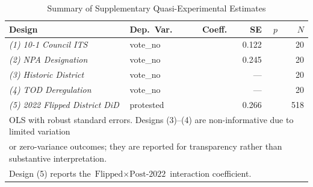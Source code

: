 \begin{table}[H]
\centering
\caption{Summary of Supplementary Quasi-Experimental Estimates}
\label{tab:geographic_causal}
\small
\begin{tabular}{@{}llrrrr@{}}
\toprule
\textbf{Design} & \textbf{Dep.\ Var.} & \textbf{Coeff.} & \textbf{SE} & \textbf{$p$} & \textbf{$N$} \\
\midrule
\textit{(1) 10-1 Council ITS}       & vote\_no       & \metricTenOneITSCoeff{}   & 0.122  & \metricTenOneITSPval{}  & 20 \\
\textit{(2) NPA Designation}   & vote\_no       & \metricNPAFrictionCoeff{} & 0.245  & \metricNPAFrictionPval{}& 20 \\
\textit{(3) Historic District}      & vote\_no       & \metricHDFrictionCoeff{}  & ---    & \metricHDFrictionPval{} & 20 \\
\textit{(4) TOD Deregulation}       & vote\_no       & \metricTODFrictionCoeff{} & ---    & \metricTODFrictionPval{}& 20 \\
\textit{(5) 2022 Flipped District DiD}& protested    & \textbf{\metricFlipDiDCoeff{}}     & 0.266  & \textbf{\metricFlipDiDPval{}}    & 518 \\
\bottomrule
\multicolumn{6}{l}{\footnotesize OLS with robust standard errors. Designs (3)--(4) are non-informative due to limited variation}\\
\multicolumn{6}{l}{\footnotesize or zero-variance outcomes; they are reported for transparency rather than substantive interpretation.} \\
\multicolumn{6}{l}{\footnotesize Design (5) reports the $\text{Flipped} \times \text{Post-2022}$ interaction coefficient.} \\
\end{tabular}
\end{table}

